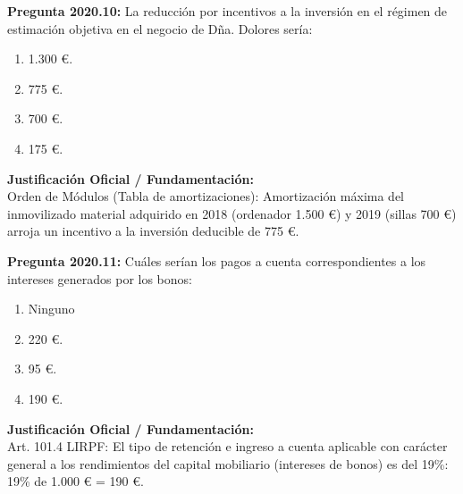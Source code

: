 \documentclass[11pt,a4paper,openany]{article}
\begin{document}
\noindent\textbf{\sffamily Pregunta 2020.10:} La reducción por incentivos a la inversión en el régimen de estimación objetiva en el negocio de Dña. Dolores sería:\\[0.15cm]
\begin{enumerate}[label=\textbf{\alph*)},leftmargin=1.8em,itemsep=1.5pt,topsep=2pt,partopsep=0pt,parsep=0pt]
    \item 1.300 \euro{}.
    \item 775 \euro{}.
    \item 700 \euro{}.
    \item 175 \euro{}.
\end{enumerate}
\begin{solucionBox}
\textbf{Justificación Oficial / Fundamentación:}\\[0.1cm]
Orden de Módulos (Tabla de amortizaciones): Amortización máxima del inmovilizado material adquirido en 2018 (ordenador 1.500 \euro{}) y 2019 (sillas 700 \euro{}) arroja un incentivo a la inversión deducible de 775 \euro{}.
\end{solucionBox}
\vspace{0.35cm}

\noindent\textbf{\sffamily Pregunta 2020.11:} Cuáles serían los pagos a cuenta correspondientes a los intereses generados por los bonos:\\[0.15cm]
\begin{enumerate}[label=\textbf{\alph*)},leftmargin=1.8em,itemsep=1.5pt,topsep=2pt,partopsep=0pt,parsep=0pt]
    \item Ninguno
    \item 220 \euro{}.
    \item 95 \euro{}.
    \item 190 \euro{}.
\end{enumerate}
\begin{solucionBox}
\textbf{Justificación Oficial / Fundamentación:}\\[0.1cm]
Art. 101.4 LIRPF: El tipo de retención e ingreso a cuenta aplicable con carácter general a los rendimientos del capital mobiliario (intereses de bonos) es del 19\%: 19\% de 1.000 \euro{} = 190 \euro{}.
\end{solucionBox}
\vspace{0.35cm}
\end{document}
